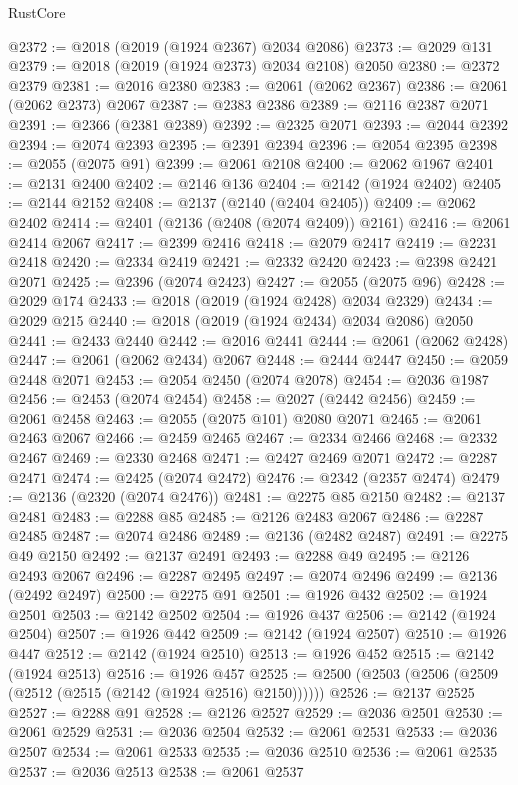 \begin{lexlean}{RustCore}
\begin{coremodule}
@2372 := @2018 (@2019 (@1924 @2367) @2034 @2086)
@2373 := @2029 @131
@2379 := @2018 (@2019 (@1924 @2373) @2034 @2108) @2050
@2380 := @2372 @2379
@2381 := @2016 @2380
@2383 := @2061 (@2062 @2367)
@2386 := @2061 (@2062 @2373) @2067
@2387 := @2383 @2386
@2389 := @2116 @2387 @2071
@2391 := @2366 (@2381 @2389)
@2392 := @2325 @2071
@2393 := @2044 @2392
@2394 := @2074 @2393
@2395 := @2391 @2394
@2396 := @2054 @2395
@2398 := @2055 (@2075 @91)
@2399 := @2061 @2108
@2400 := @2062 @1967
@2401 := @2131 @2400
@2402 := @2146 @136
@2404 := @2142 (@1924 @2402)
@2405 := @2144 @2152
@2408 := @2137 (@2140 (@2404 @2405))
@2409 := @2062 @2402
@2414 := @2401 (@2136 (@2408 (@2074 @2409)) @2161)
@2416 := @2061 @2414 @2067
@2417 := @2399 @2416
@2418 := @2079 @2417
@2419 := @2231 @2418
@2420 := @2334 @2419
@2421 := @2332 @2420
@2423 := @2398 @2421 @2071
@2425 := @2396 (@2074 @2423)
@2427 := @2055 (@2075 @96)
@2428 := @2029 @174
@2433 := @2018 (@2019 (@1924 @2428) @2034 @2329)
@2434 := @2029 @215
@2440 := @2018 (@2019 (@1924 @2434) @2034 @2086) @2050
@2441 := @2433 @2440
@2442 := @2016 @2441
@2444 := @2061 (@2062 @2428)
@2447 := @2061 (@2062 @2434) @2067
@2448 := @2444 @2447
@2450 := @2059 @2448 @2071
@2453 := @2054 @2450 (@2074 @2078)
@2454 := @2036 @1987
@2456 := @2453 (@2074 @2454)
@2458 := @2027 (@2442 @2456)
@2459 := @2061 @2458
@2463 := @2055 (@2075 @101) @2080 @2071
@2465 := @2061 @2463 @2067
@2466 := @2459 @2465
@2467 := @2334 @2466
@2468 := @2332 @2467
@2469 := @2330 @2468
@2471 := @2427 @2469 @2071
@2472 := @2287 @2471
@2474 := @2425 (@2074 @2472)
@2476 := @2342 (@2357 @2474)
@2479 := @2136 (@2320 (@2074 @2476))
@2481 := @2275 @85 @2150
@2482 := @2137 @2481
@2483 := @2288 @85
@2485 := @2126 @2483 @2067
@2486 := @2287 @2485
@2487 := @2074 @2486
@2489 := @2136 (@2482 @2487)
@2491 := @2275 @49 @2150
@2492 := @2137 @2491
@2493 := @2288 @49
@2495 := @2126 @2493 @2067
@2496 := @2287 @2495
@2497 := @2074 @2496
@2499 := @2136 (@2492 @2497)
@2500 := @2275 @91
@2501 := @1926 @432
@2502 := @1924 @2501
@2503 := @2142 @2502
@2504 := @1926 @437
@2506 := @2142 (@1924 @2504)
@2507 := @1926 @442
@2509 := @2142 (@1924 @2507)
@2510 := @1926 @447
@2512 := @2142 (@1924 @2510)
@2513 := @1926 @452
@2515 := @2142 (@1924 @2513)
@2516 := @1926 @457
@2525 := @2500 (@2503 (@2506 (@2509 (@2512 (@2515 (@2142 (@1924 @2516) @2150))))))
@2526 := @2137 @2525
@2527 := @2288 @91
@2528 := @2126 @2527
@2529 := @2036 @2501
@2530 := @2061 @2529
@2531 := @2036 @2504
@2532 := @2061 @2531
@2533 := @2036 @2507
@2534 := @2061 @2533
@2535 := @2036 @2510
@2536 := @2061 @2535
@2537 := @2036 @2513
@2538 := @2061 @2537

\end{coremodule}
\end{lexlean}
